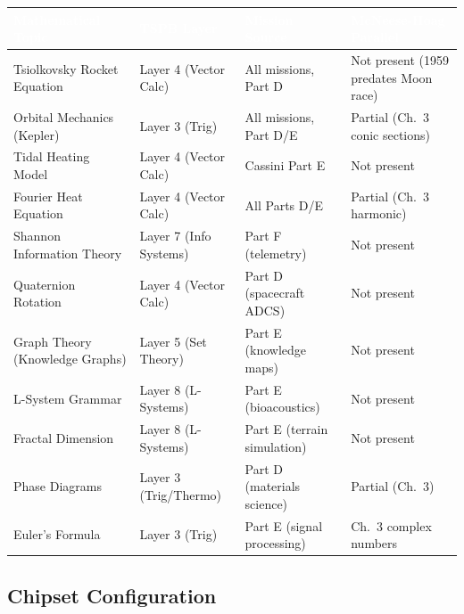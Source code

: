 \documentclass[11pt,letterpaper]{article}
\newcommand{\tableheader}[1]{\textbf{\sffamily\textcolor{white}{#1}}}
\begin{document}
\begin{center}
\begin{tabularx}{\textwidth}{L{3.5cm}L{2.5cm}L{3cm}X}
\toprule
{}
\tableheader{Mathematical Topic} & \tableheader{TSPB Layer} & \tableheader{Mission Source} & \tableheader{McNeese-Hoag Parallel} \\
\midrule
Tsiolkovsky Rocket Equation & Layer 4 (Vector Calc) & All missions, Part D & Not present (1959 predates Moon race) \\
Orbital Mechanics (Kepler) & Layer 3 (Trig) & All missions, Part D/E & Partial (Ch.\ 3 conic sections) \\
Tidal Heating Model & Layer 4 (Vector Calc) & Cassini Part E & Not present \\
Fourier Heat Equation & Layer 4 (Vector Calc) & All Parts D/E & Partial (Ch.\ 3 harmonic) \\
Shannon Information Theory & Layer 7 (Info Systems) & Part F (telemetry) & Not present \\
Quaternion Rotation & Layer 4 (Vector Calc) & Part D (spacecraft ADCS) & Not present \\
Graph Theory (Knowledge Graphs) & Layer 5 (Set Theory) & Part E (knowledge maps) & Not present \\
L-System Grammar & Layer 8 (L-Systems) & Part E (bioacoustics) & Not present \\
Fractal Dimension & Layer 8 (L-Systems) & Part E (terrain simulation) & Not present \\
Phase Diagrams & Layer 3 (Trig/Thermo) & Part D (materials science) & Partial (Ch.\ 3) \\
Euler's Formula & Layer 3 (Trig) & Part E (signal processing) & Ch.\ 3 complex numbers \\
\bottomrule
\end{tabularx}
\end{center}

\subsection{Chipset Configuration}
\end{document}
